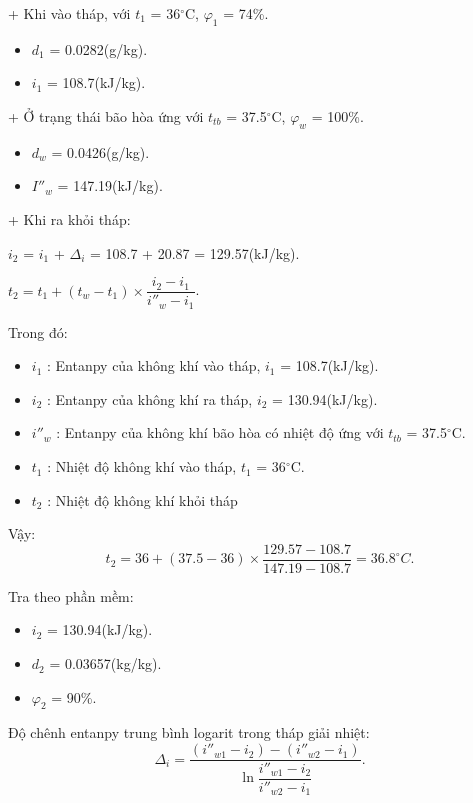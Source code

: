 + Khi vào tháp, với $t_{1}$ = 36$^{\circ}$C, $\varphi_{1}$ = 74\%.
\begin{itemize}
	\item $d_{1}$ = 0.0282(g/kg).
	\item $i_{1}$ = 108.7(kJ/kg).
\end{itemize}

+ Ở trạng thái bão hòa ứng với $t_{tb}$ = 37.5$^{\circ}$C, $\varphi_{w}$ = 100\%.
\begin{itemize}
	\item $d_{w}$ = 0.0426(g/kg).
	\item $I''_{w}$ = 147.19(kJ/kg).
\end{itemize}

\newpage
+ Khi ra khỏi tháp:

	$i_{2}$ = $i_{1}$ + $\Delta_{i}$ = 108.7 + 20.87 = 129.57(kJ/kg).
	
	$t_{2} = t_{1} + (t_{w} - t_{1}) \times \dfrac{i_{2} - i_{1}}{i''_{w} - i_{1}}$.
	
Trong đó:
\begin{itemize}
	\item $i_{1}$ : Entanpy của không khí vào tháp, $i_{1}$ = 108.7(kJ/kg).
	\item $i_{2}$ : Entanpy của không khí ra tháp, $i_{2}$ = 130.94(kJ/kg).
	\item $i''_{w}$ : Entanpy của không khí bão hòa có nhiệt độ ứng với $t_{tb}$ = 37.5$^{\circ}$C.
	\item $t_{1}$ : Nhiệt độ không khí vào tháp, $t_{1}$ = 36$^{\circ}$C.
	\item $t_{2}$ : Nhiệt độ không khí khỏi tháp
\end{itemize}
 Vậy:
 \begin{equation*}
 	t_{2} = 36 + (37.5 - 36 ) \times \dfrac{129.57 - 108.7}{147.19 - 108.7} = 36.8^{\circ}C.
 \end{equation*}

Tra theo phần mềm:
\begin{itemize}
	\item $i_{2}$ = 130.94(kJ/kg).
	\item $d_{2}$ = 0.03657(kg/kg).
	\item $\varphi_{2}$ = 90\%.
\end{itemize}

Độ chênh entanpy trung bình logarit trong tháp giải nhiệt:
\begin{equation*}
	\Delta_{i} = \dfrac{(i''_{w1} - i_{2}) - (i''_{w2} - i_{1}) }{\ln \dfrac{i''_{w1} - i_{2}}{i''_{w2} - i_{1}}}.
\end{equation*}

